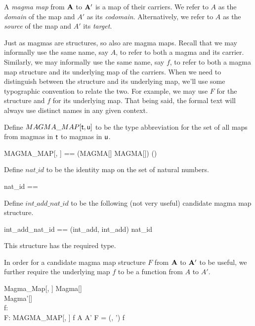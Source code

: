 \documentclass{amsart}
\begin{document}
A \textit{magma map} from $\mathbf{A}$ to $\mathbf{A}'$ is a map of their carriers.
We refer to $A$ as the \textit{domain} of the map and $A'$ as its \textit{codomain}.
Alternatively, we refer to $A$ as the \textit{source} of the map and $A'$ its \textit{target}.

Just as magmas are structures, so also are magma maps.
Recall that we may informally use the same name, say $A$, to refer to both a magma and its carrier.
Similarly, we may informally use the same name, say $f$, to refer to both a magma map
structure and its underlying map of the carriers.
When we need to distinguish between the structure and its underlying map,
we'll use some typographic convention to relate the two.
For example, we may use $F$ for the structure and $f$ for its underlying map.
That being said, the formal text will always use distinct names in any given context.

Define $MAGMA\_MAP[\mathsf{t}, \mathsf{u}]$ to be the type abbreviation for the set of
all maps from magmas in $\mathsf{t}$ to magmas in $\mathsf{u}$.

\begin{zed}
	MAGMA\_MAP[\genT, \genU] == (MAGMA[\genT] \cross MAGMA[\genU]) \cross (\genT \pfun \genU)
\end{zed}

\begin{example}
Define $nat\_id$ to be the identity map on the set of natural numbers.
\begin{zed}
	nat\_id == \id \nat
\end{zed}

Define $int\_add\_nat\_id$ to be the following (not very useful) 
candidate magma map structure.
\begin{zed}
	int\_add\_nat\_id == (int\_add, int\_add) \mapsto nat\_id
\end{zed}

This structure has the required type.

\end{example}

In order for a candidate magma map structure $F$ from $\mathbf{A}$ to $\mathbf{A}'$ to be useful,
we further require the underlying map $f$ to be a function from $A$ to $A'$.

\begin{schema}{Magma\_Map}[\genT, \genU]
	Magma[\genT] \\
	Magma'[\genU] \\
	f: \genT \pfun \genU \\
	F: MAGMA\_MAP[\genT, \genU]
\where
	f \in A \fun A'
\also
	F = (\strucA, \strucA') \mapsto f
\end{schema}
\end{document}
